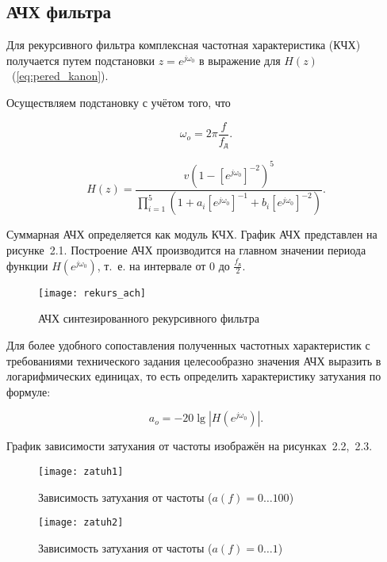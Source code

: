 \subsection{АЧХ фильтра}

Для рекурсивного фильтра комплексная частотная характеристика (КЧХ)
получается путем подстановки $z = e^{j\omega_0}$ в выражение для
$H(z)$~(\ref{eq:pered_kanon}).

Осуществляем подстановку с учётом того, что

\begin{equation*}
  \omega_o = 2\pi\frac{f}{f_{\text{д}}}.
\end{equation*}

\begin{equation*}
  H(z) = \frac{v(1 -
    \left[e^{j\omega_0}\right]^{-2})^5}{\prod_{i=1}^5\left(1 + a_i
      \left[e^{j\omega_0} \right]^{-1} +b_i
      \left[e^{j\omega_0}\right]^{-2}\right)}.
\end{equation*}

Суммарная АЧХ определяется как модуль КЧХ. График АЧХ представлен на
рисунке~2.1. Построение АЧХ производится на главном
значении периода функции $H(e^{j \omega_0})$, т.~е. на интервале от 0
до $\frac{f_{\text{д}}}{2}$.

\begin{figure}[h!]
  \label{fig:rekurs_ach}
  \texttt{[image: rekurs\_ach]}
  \caption{АЧХ синтезированного рекурсивного фильтра}
\end{figure}

Для более удобного сопоставления полученных частотных характеристик с
требованиями технического задания целесообразно значения АЧХ выразить
в логарифмических единицах, то есть определить характеристику
затухания по формуле:

\begin{equation*}
  a_o = -20 \lg\left|H(e^{j\omega_0})\right|.
\end{equation*}

График зависимости затухания от частоты изображён на рисунках~2.2,~2.3.

\begin{figure}[h!]
  \label{fig:zatuh1}
  \texttt{[image: zatuh1]}
  \caption{Зависимость затухания от частоты ($a(f) = 0 \ldots 100$)}
\end{figure}

\begin{figure}[h!]
  \label{fig:zatuh2}
  \texttt{[image: zatuh2]}
  \caption{Зависимость затухания от частоты ($a(f) = 0 \ldots 1$)}
\end{figure}

